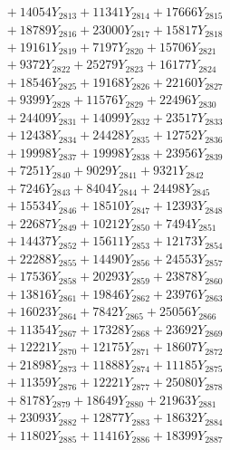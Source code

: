 \documentclass[a4paper,10pt]{article}
\begin{document}
{\begin{align}
&\;  + 14054 Y_{2813} + 11341 Y_{2814} + 17666 Y_{2815} \\[0.3ex]
&\;  + 18789 Y_{2816} + 23000 Y_{2817} + 15817 Y_{2818} \\[0.5ex]\allowbreak
&\;  + 19161 Y_{2819} + 7197 Y_{2820} + 15706 Y_{2821} \\[0.3ex]
&\;  + 9372 Y_{2822} + 25279 Y_{2823} + 16177 Y_{2824} \\[0.3ex]
&\;  + 18546 Y_{2825} + 19168 Y_{2826} + 22160 Y_{2827} \\[0.3ex]
&\;  + 9399 Y_{2828} + 11576 Y_{2829} + 22496 Y_{2830} \\[0.3ex]
&\;  + 24409 Y_{2831} + 14099 Y_{2832} + 23517 Y_{2833} \\[0.3ex]
&\;  + 12438 Y_{2834} + 24428 Y_{2835} + 12752 Y_{2836} \\[0.3ex]
&\;  + 19998 Y_{2837} + 19998 Y_{2838} + 23956 Y_{2839} \\[0.3ex]
&\;  + 7251 Y_{2840} + 9029 Y_{2841} + 9321 Y_{2842} \\[0.3ex]
&\;  + 7246 Y_{2843} + 8404 Y_{2844} + 24498 Y_{2845} \\[0.3ex]
&\;  + 15534 Y_{2846} + 18510 Y_{2847} + 12393 Y_{2848} \\[0.5ex]\allowbreak
&\;  + 22687 Y_{2849} + 10212 Y_{2850} + 7494 Y_{2851} \\[0.3ex]
&\;  + 14437 Y_{2852} + 15611 Y_{2853} + 12173 Y_{2854} \\[0.3ex]
&\;  + 22288 Y_{2855} + 14490 Y_{2856} + 24553 Y_{2857} \\[0.3ex]
&\;  + 17536 Y_{2858} + 20293 Y_{2859} + 23878 Y_{2860} \\[0.3ex]
&\;  + 13816 Y_{2861} + 19846 Y_{2862} + 23976 Y_{2863} \\[0.3ex]
&\;  + 16023 Y_{2864} + 7842 Y_{2865} + 25056 Y_{2866} \\[0.3ex]
&\;  + 11354 Y_{2867} + 17328 Y_{2868} + 23692 Y_{2869} \\[0.3ex]
&\;  + 12221 Y_{2870} + 12175 Y_{2871} + 18607 Y_{2872} \\[0.3ex]
&\;  + 21898 Y_{2873} + 11888 Y_{2874} + 11185 Y_{2875} \\[0.3ex]
&\;  + 11359 Y_{2876} + 12221 Y_{2877} + 25080 Y_{2878} \\[0.5ex]\allowbreak
&\;  + 8178 Y_{2879} + 18649 Y_{2880} + 21963 Y_{2881} \\[0.3ex]
&\;  + 23093 Y_{2882} + 12877 Y_{2883} + 18632 Y_{2884} \\[0.3ex]
&\;  + 11802 Y_{2885} + 11416 Y_{2886} + 18399 Y_{2887} \\[0.3ex]

\end{align}}
\end{document}
